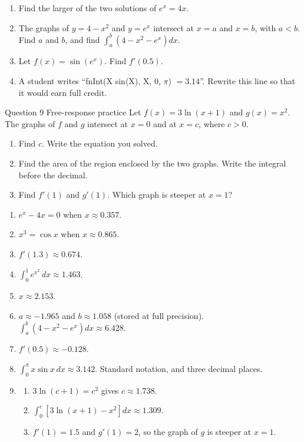 \documentclass[11pt]{article}
\begin{document}
\begin{enumerate}[leftmargin=*,itemsep=2pt,start=5]
  \item Find the larger of the two solutions of $e^{x}=4x$.\work{2.8cm}
  \item The graphs of $y=4-x^2$ and $y=e^{x}$ intersect at $x=a$ and $x=b$, with $a<b$. Find $a$ and $b$, and find $\displaystyle\int_a^b\left(4-x^2-e^{x}\right)dx$.\work{2.8cm}
  \item Let $f(x)=\sin\!\left(e^{x}\right)$. Find $f'(0.5)$.\work{2.8cm}
  \item A student writes \textquotedblleft{}fnInt(X sin(X), X, 0, $\pi$) $=3.14$\textquotedblright{}. Rewrite this line so that it would earn full credit.\work{2.8cm}
\end{enumerate}

\begin{frbox}{Question 9 \textperiodcentered{} Free-response practice}
Let $f(x)=3\ln(x+1)$ and $g(x)=x^2$. The graphs of $f$ and $g$ intersect at $x=0$ and at $x=c$, where $c>0$.
\begin{enumerate}[label=(\alph*),leftmargin=*,itemsep=2pt]
  \item Find $c$. Write the equation you solved.\work{2.6cm}
  \item Find the area of the region enclosed by the two graphs. Write the integral before the decimal.\work{2.6cm}
  \item Find $f'(1)$ and $g'(1)$. Which graph is steeper at $x=1$?\work{2.6cm}
\end{enumerate}
\end{frbox}

\newpage
\begin{solbox}
\begin{enumerate}[leftmargin=*,itemsep=4pt]
  \item $e^{x}-4x=0$ when $x\approx0.357$.
  \item $x^3=\cos x$ when $x\approx0.865$.
  \item $f'(1.3)\approx0.674$.
  \item $\displaystyle\int_0^1e^{x^2}\,dx\approx1.463$.
  \item $x\approx2.153$.
  \item $a\approx-1.965$ and $b\approx1.058$ (stored at full precision). $\displaystyle\int_a^b\left(4-x^2-e^{x}\right)dx\approx6.428$.
  \item $f'(0.5)\approx-0.128$.
  \item $\displaystyle\int_0^{\pi}x\sin x\,dx\approx3.142$. Standard notation, and three decimal places.
  \item \begin{enumerate}[label=(\alph*),leftmargin=*,itemsep=3pt]
    \item $3\ln(c+1)=c^2$ gives $c\approx1.738$.
    \item $\displaystyle\int_0^{c}\left[3\ln(x+1)-x^2\right]dx\approx1.309$.
    \item $f'(1)=1.5$ and $g'(1)=2$, so the graph of $g$ is steeper at $x=1$.
  \end{enumerate}
\end{enumerate}
\end{solbox}
\end{document}

